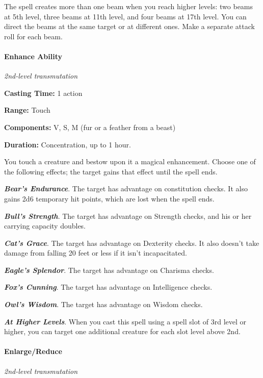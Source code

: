 \documentclass[
]{article}
\begin{document}
The spell creates more than one beam when you reach higher levels: two
beams at 5th level, three beams at 11th level, and four beams at 17th
level. You can direct the beams at the same target or at different ones.
Make a separate attack roll for each beam.

\hypertarget{enhance-ability}{%
\paragraph{Enhance Ability}\label{enhance-ability}}

\emph{2nd-level transmutation}

\textbf{Casting Time:} 1 action

\textbf{Range:} Touch

\textbf{Components:} V, S, M (fur or a feather from a beast)

\textbf{Duration:} Concentration, up to 1 hour.

You touch a creature and bestow upon it a magical enhancement. Choose
one of the following effects; the target gains that effect until the
spell ends.

\emph{\textbf{Bear's Endurance}}. The target has advantage on
constitution checks. It also gains 2d6 temporary hit points, which are
lost when the spell ends.

\emph{\textbf{Bull's Strength}}. The target has advantage on Strength
checks, and his or her carrying capacity doubles.

\emph{\textbf{Cat's Grace}}. The target has advantage on Dexterity
checks. It also doesn't take damage from falling 20 feet or less if it
isn't incapacitated.

\emph{\textbf{Eagle's Splendor}}. The target has advantage on Charisma
checks.

\emph{\textbf{Fox's Cunning}}. The target has advantage on Intelligence
checks.

\emph{\textbf{Owl's Wisdom}}. The target has advantage on Wisdom checks.

\emph{\textbf{At Higher Levels}}. When you cast this spell using a spell
slot of 3rd level or higher, you can target one additional creature for
each slot level above 2nd.

\hypertarget{enlargereduce}{%
\paragraph{Enlarge/Reduce}\label{enlargereduce}}

\emph{2nd-level transmutation}
\end{document}
